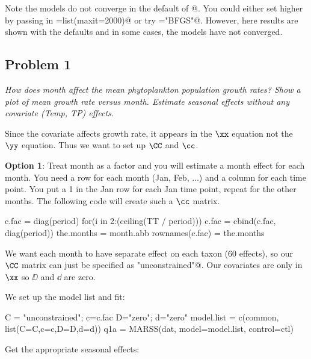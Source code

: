 Note the models do not converge in the default of @.  You could either set \verb@maxit@ higher by passing in \verb@control=list(maxit=2000)@ or try \verb@method="BFGS"@.  However, here results are shown with the defaults and in some cases, the models have not converged.


\subsection*{Problem 1}

\textit{How does month affect the mean phytoplankton population growth rates? Show a plot of mean growth rate versus month. Estimate seasonal effects without any covariate (Temp, TP) effects.}

\bigskip
Since the covariate affects growth rate, it appears in the $\xx$ equation not the $\yy$ equation.  Thus we want to set up $\CC$ and $\cc$.

\bigskip
{\bf Option 1}:  Treat month as a factor and you will estimate a month effect for each month. You need a row for each month (Jan, Feb, ...) and a column for each time point. You put a 1 in the Jan row for each Jan time point, repeat for the other months. The following code will create such a $\cc$ matrix.
\begin{Schunk}
\begin{Sinput}
 c.fac = diag(period)
 for(i in 2:(ceiling(TT / period))) { c.fac = cbind(c.fac, diag(period)) }
 the.months = month.abb
 rownames(c.fac) = the.months
\end{Sinput}
\end{Schunk}
We want each month to have separate effect on each taxon (60 effects), so our $\CC$ matrix can just be specified as \verb@"unconstrained"@. Our covariates are only in $\xx$ so $\DD$ and $\dd$ are zero.

We set up the model list and fit:
\begin{Schunk}
\begin{Sinput}
 C = "unconstrained"; c=c.fac
 D="zero"; d="zero"
 model.list = c(common, list(C=C,c=c,D=D,d=d))
 q1a = MARSS(dat, model=model.list, control=ctl)
\end{Sinput}
\end{Schunk}
Get the appropriate seasonal effects:
\begin{Schunk}
\end{Schunk}

